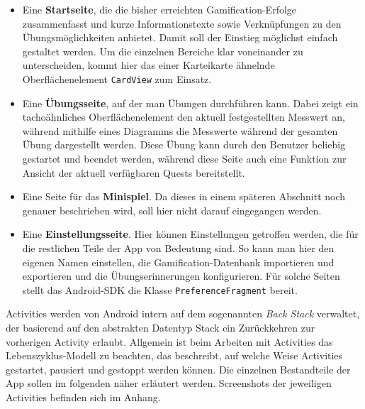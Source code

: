 \begin{itemize}
	\item Eine \textbf{Startseite}, die die bisher erreichten Gamification-Erfolge zusammenfasst und kurze Informationstexte sowie Verknüpfungen zu den Übungsmöglichkeiten anbietet. Damit soll der Einstieg möglichst einfach gestaltet werden. Um die einzelnen Bereiche klar voneinander zu unterscheiden, kommt hier das einer Karteikarte ähnelnde Oberflächenelement \texttt{CardView} zum Einsatz.
	\item Eine \textbf{Übungsseite}, auf der man Übungen durchführen kann. Dabei zeigt ein tachoähnliches Oberflächenelement den aktuell festgestellten Messwert an, während mithilfe eines Diagramms die Messwerte während der gesamten Übung dargestellt werden. Diese Übung kann durch den Benutzer beliebig gestartet und beendet werden, während diese Seite auch eine Funktion zur Ansicht der aktuell verfügbaren Quests bereitstellt.
	\item Eine Seite für das \textbf{Minispiel}. Da dieses in einem späteren Abschnitt noch genauer beschrieben wird, soll hier nicht darauf eingegangen werden.
	\item Eine \textbf{Einstellungsseite}. Hier können Einstellungen getroffen werden, die für die restlichen Teile der App von Bedeutung sind. So kann man hier den eigenen Namen einstellen, die Gamification-Datenbank importieren und exportieren und die Übungserinnerungen konfigurieren. Für solche Seiten stellt das Android-SDK die Klasse \texttt{PreferenceFragment}\cite{Src:AndroidKuenneth} bereit.
\end{itemize}
Activities werden von Android intern auf dem sogenannten \textit{Back Stack} verwaltet, der basierend auf den abstrakten Datentyp Stack ein Zurückkehren zur vorherigen Activity erlaubt. Allgemein ist beim Arbeiten mit Activities das Lebenszyklus-Modell zu beachten, das beschreibt, auf welche Weise Activities gestartet, pausiert und gestoppt werden können.\cite{Src:AndroidKuenneth} Die einzelnen Bestandteile der App sollen im folgenden näher erläutert werden. Screenshots der jeweiligen Activities befinden sich im Anhang.
